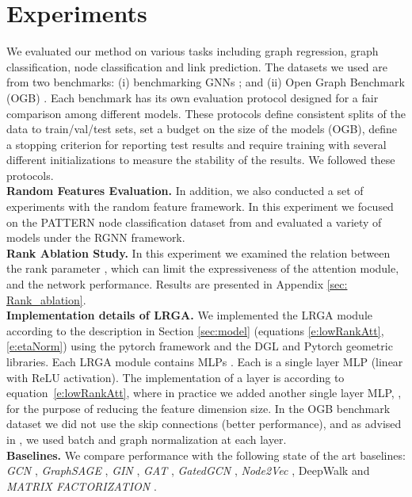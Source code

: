\documentclass{article} \usepackage{iclr2021_conference,times}
\def\eqref#1{equation~\ref{#1}}
\begin{document}
\section{Experiments}
We evaluated our method on various tasks including graph regression, graph classification, node classification and link prediction. The datasets we used are from two benchmarks: (i) benchmarking GNNs \citep{dwivedi2020benchmarking}; and (ii) Open Graph Benchmark (OGB) \citep{Hu2020}.  Each benchmark has its own evaluation protocol designed for a fair comparison among different models. These protocols define consistent splits of the data to train/val/test sets, set a budget on the size of the models (OGB), define a stopping criterion for reporting test results and require training with several different initializations to measure the stability of the results. We followed these protocols.\\
\textbf{Random Features Evaluation.} In addition, we also conducted a set of experiments with the random feature framework. In this experiment we focused on the PATTERN node classification dataset from \citep{dwivedi2020benchmarking} and evaluated a variety of models under the RGNN framework.\\
\textbf{Rank Ablation Study.} In this experiment we examined the relation between the rank parameter , which can limit the expressiveness of the attention module, and the network performance. Results are presented in Appendix \ref{sec: Rank_ablation}.\\
\textbf{Implementation details of LRGA.} We implemented the LRGA module according to the description in Section \ref{sec:model} (equations \ref{e:lowRankAtt}, \ref{e:etaNorm}) using the pytorch framework and the DGL \citep{wang2019dgl} and Pytorch geometric \citep{fey2019fast} libraries. Each LRGA module contains  MLPs . Each  is a single layer MLP (linear with ReLU activation). The implementation of a layer is according to \eqref{e:lowRankAtt}, where in practice we added another single layer MLP,  , for the purpose of reducing the feature dimension size. In the OGB benchmark dataset we did not use the skip connections (better performance), and as advised in \citep{wang2019dgl}, we used batch and graph normalization at each layer. \\
\textbf{Baselines.} We compare performance with the following state of the art baselines: \textit{GCN} \citep{Kipf2016}, \textit{GraphSAGE} \citep{Hamilton2017}, \textit{GIN} \citep{xu2018how}, \textit{GAT} \citep{Velickovic2018}, \textit{GatedGCN} \citep{Bresson2017Gated}, \textit{Node2Vec} \citep{grover2016node2vec} , DeepWalk \citep{Perozzi_2014} and \textit{MATRIX FACTORIZATION} \citep{Hu2020}.
\end{document}
